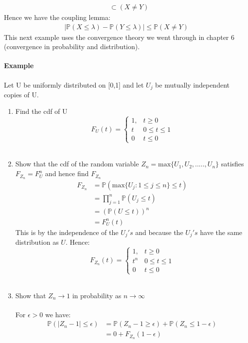 \documentclass[,oneside]{article}
\begin{document}
\begin{enumerate}
\begin{align*}
&\subset (X \neq Y)
\end{align*}
Hence we have the coupling lemma:
\begin{align*}
|\mathbb{P}(X \leq \lambda )-\mathbb{P}(Y \leq \lambda )| \leq \mathbb{P}(X \neq Y)
\end{align*}
This next example uses the convergence theory we went through in chapter 6 (convergence in probability and distribution).\\ \\
\textbf{Example}\\ \\
Let U be uniformly distributed on [0,1] and let $U_j$ be mutually independent copies of U.
\begin{enumerate}
\item Find the cdf of U \\
\[
F_U(t)=
\begin{cases}
1, & t \geq 0 \\
t &  0 \leq t \leq 1\\
0 & t \leq 0 
\end{cases} \] \\
\item Show that the cdf of the random variable $Z_n=\text{max} \{U_1,U_2,.....,U_n \}$ satisfies $F_{Z_n}=F_U^n$ and hence find $F_{Z_n}$
\begin{align*}
F_{Z_n} &= \mathbb{P}(\text{max}\{ U_j : 1 \leq j \leq n \} \leq t )\\
&= \prod_{j=1}^{n}\mathbb{P}(U_j \leq t)\\
&= (\mathbb{P}(U \leq t))^n\\
&= F_U^n(t)
\end{align*}
This is by the independence of the ${U_j}'s$ and because the ${U_j}'s$ have the same distribution as $U$. Hence:
\[
F_{Z_n}(t)=
\begin{cases}
1, & t \geq 0 \\
t^n &  0 \leq t \leq 1\\
0 & t \leq 0 
\end{cases} \] \\
\item Show that $Z_n \rightarrow 1$ in probability as $n \rightarrow \infty$\\ \\
For $\epsilon > 0$ we have:
\begin{align*}
\mathbb{P}(|Z_n-1| \leq \epsilon)&=\mathbb{P}(Z_n-1 \geq \epsilon)+\mathbb{P}(Z_n \leq 1-\epsilon)\\
&= 0+F_{Z_n}(1-\epsilon)\\

\end{align*}
\end{enumerate}
\end{enumerate}
\end{document}
